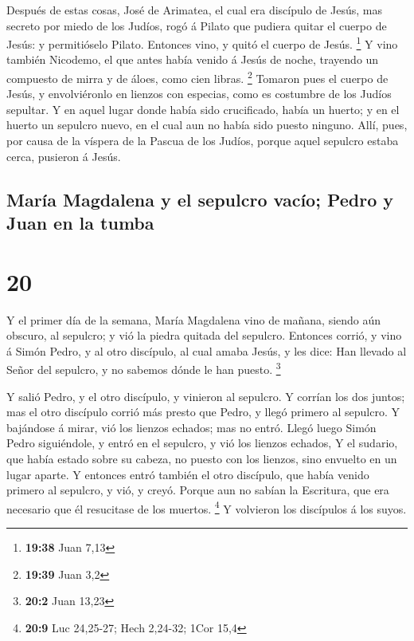  Después de estas cosas, José de Arimatea, el cual era
discípulo de Jesús, mas secreto por miedo de los Judíos, rogó á Pilato
que pudiera quitar el cuerpo de Jesús: y permitióselo Pilato. Entonces
vino, y quitó el cuerpo de Jesús. \footnote{\textbf{19:38} Juan 7,13}
 Y vino también Nicodemo, el que antes había venido á Jesús
de noche, trayendo un compuesto de mirra y de áloes, como cien libras.
\footnote{\textbf{19:39} Juan 3,2}  Tomaron pues el cuerpo
de Jesús, y envolviéronlo en lienzos con especias, como es costumbre de
los Judíos sepultar.  Y en aquel lugar donde había sido
crucificado, había un huerto; y en el huerto un sepulcro nuevo, en el
cual aun no había sido puesto ninguno.  Allí, pues, por
causa de la víspera de la Pascua de los Judíos, porque aquel sepulcro
estaba cerca, pusieron á Jesús.

\hypertarget{maruxeda-magdalena-y-el-sepulcro-vacuxedo-pedro-y-juan-en-la-tumba}{%
\subsection{María Magdalena y el sepulcro vacío; Pedro y Juan en la
tumba}\label{maruxeda-magdalena-y-el-sepulcro-vacuxedo-pedro-y-juan-en-la-tumba}}

\hypertarget{section-19}{%
\section{20}\label{section-19}}

 Y el primer día de la semana, María Magdalena vino de
mañana, siendo aún obscuro, al sepulcro; y vió la piedra quitada del
sepulcro.  Entonces corrió, y vino á Simón Pedro, y al otro
discípulo, al cual amaba Jesús, y les dice: Han llevado al Señor del
sepulcro, y no sabemos dónde le han puesto. \footnote{\textbf{20:2} Juan
  13,23}

 Y salió Pedro, y el otro discípulo, y vinieron al sepulcro.
 Y corrían los dos juntos; mas el otro discípulo corrió más
presto que Pedro, y llegó primero al sepulcro.  Y bajándose
á mirar, vió los lienzos echados; mas no entró.  Llegó luego
Simón Pedro siguiéndole, y entró en el sepulcro, y vió los lienzos
echados,  Y el sudario, que había estado sobre su cabeza, no
puesto con los lienzos, sino envuelto en un lugar aparte.  Y
entonces entró también el otro discípulo, que había venido primero al
sepulcro, y vió, y creyó.  Porque aun no sabían la
Escritura, que era necesario que él resucitase de los muertos.
\footnote{\textbf{20:9} Luc 24,25-27; Hech 2,24-32; 1Cor 15,4}
 Y volvieron los discípulos á los suyos.

